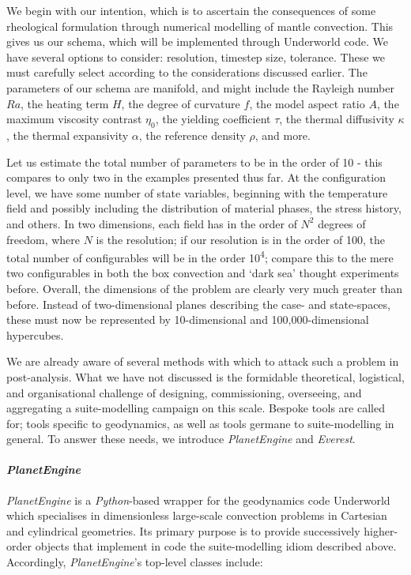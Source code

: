 \documentclass[a4paper,11pt,oneside]{book}
\begin{document}
We begin with our intention, which is to ascertain the consequences of some rheological formulation through numerical modelling of mantle convection. This gives us our schema, which will be implemented through Underworld code. We have several options to consider: resolution, timestep size, tolerance. These we must carefully select according to the considerations discussed earlier. The parameters of our schema are manifold, and might include the Rayleigh number $Ra$, the heating term $H$, the degree of curvature $f$, the model aspect ratio $A$, the maximum viscosity contrast $\eta_0$, the yielding coefficient $\tau$, the thermal diffusivity $\kappa$, the thermal expansivity $\alpha$, the reference density $\rho$, and more.

Let us estimate the total number of parameters to be in the order of 10 - this compares to only two in the examples presented thus far. At the configuration level, we have some number of state variables, beginning with the temperature field and possibly including the distribution of material phases, the stress history, and others. In two dimensions, each field has in the order of $N^2$ degrees of freedom, where $N$ is the resolution; if our resolution is in the order of 100, the total number of configurables will be in the order 10\textsuperscript{4}; compare this to the mere two configurables in both the box convection and `dark sea' thought experiments before. Overall, the dimensions of the problem are clearly very much greater than before. Instead of two-dimensional planes describing the case- and state-spaces, these must now be represented by 10-dimensional and 100,000-dimensional hypercubes.

We are already aware of several methods with which to attack such a problem in post-analysis. What we have not discussed is the formidable theoretical, logistical, and organisational challenge of designing, commissioning, overseeing, and aggregating a suite-modelling campaign on this scale. Bespoke tools are called for; tools specific to geodynamics, as well as tools germane to suite-modelling in general. To answer these needs, we introduce \textit{PlanetEngine} and \textit{Everest}.

\paragraph{\textit{PlanetEngine}}

\textit{PlanetEngine} is a \textit{Python}-based wrapper for the geodynamics code Underworld which specialises in dimensionless large-scale convection problems in Cartesian and cylindrical geometries. Its primary purpose is to provide successively higher-order objects that implement in code the suite-modelling idiom described above. Accordingly, \textit{PlanetEngine}'s top-level classes include:
\end{document}
